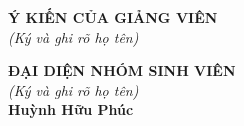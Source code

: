\documentclass[12pt,a4paper]{article}
\begin{document}
\vspace{0.6cm}
\noindent
\begin{minipage}[t]{0.5\textwidth}
    \centering
    \textbf{Ý KIẾN CỦA GIẢNG VIÊN}\\
    \textit{(Ký và ghi rõ họ tên)}
\end{minipage}
\begin{minipage}[t]{0.5\textwidth}
    \centering
    \textbf{ĐẠI DIỆN NHÓM SINH VIÊN}\\
    \textit{(Ký và ghi rõ họ tên)}\\[2cm]
    \textbf{Huỳnh Hữu Phúc}
\end{minipage}
\end{document}

